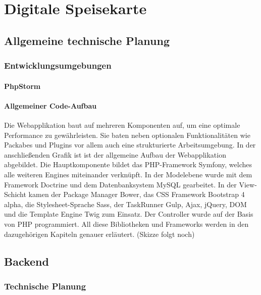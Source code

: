 \chapter{Digitale Speisekarte}
\renewcommand{\kapitelautor}{Autor: Katharina Joksch}

\section{Allgemeine technische Planung}

  \subsection{Entwicklungsumgebungen}

    \subsubsection{PhpStorm}

    \subsubsection{Allgemeiner Code-Aufbau}

	Die Webapplikation baut auf mehreren Komponenten auf, um eine optimale Performance zu gewährleisten. Sie baten neben optionalen Funktionalitäten wie Packabes und Plugins vor allem auch eine strukturierte Arbeitsumgebung.
	In der anschließenden Grafik ist ist der allgemeine Aufbau der Webapplikation abgebildet. Die Hauptkomponente bildet das PHP-Framework Symfony, welches alle weiteren Engines miteinander verknüpft. In der Modelebene wurde mit dem Framework Doctrine und dem Datenbanksystem MySQL gearbeitet. In der View-Schicht kamen der Package Manager Bower, das CSS Framework Bootstrap 4 alpha, die Stylesheet-Sprache Sass, der TaskRunner Gulp, Ajax, jQuery, DOM und die Template Engine Twig zum Einsatz. Der Controller wurde auf der Basis von PHP programmiert. All diese Bibliotheken und Frameworks werden in den dazugehörigen Kapiteln genauer erläutert.
	(Skizze folgt noch)

\section{Backend}

  \subsection{Technische Planung}

